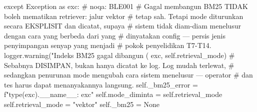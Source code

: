 except Exception as exc:  # noqa: BLE001
    # Gagal membangun BM25 TIDAK boleh mematikan retriever: jalur vektor
    # tetap sah. Tetapi mode diturunkan secara EKSPLISIT dan dicatat, supaya
    # sistem tidak diam-diam menelusur dengan cara yang berbeda dari yang
    # dinyatakan config — persis jenis penyimpangan senyap yang menjadi
    # pokok penyelidikan T7-T14.
    logger.warning("Indeks BM25 gagal dibangun (%
                   exc, self.retrieval_mode)
    # Sebabnya DISIMPAN, bukan hanya dicatat ke log. Log mudah terlewat,
    # sedangkan penurunan mode mengubah cara sistem menelusur — operator
    # dan tes harus dapat menanyakannya langsung.
    self._bm25_error = f"{type(exc).__name__}: {exc}"
    self.mode_diminta = self.retrieval_mode
    self.retrieval_mode = "vektor"
    self._bm25 = None
